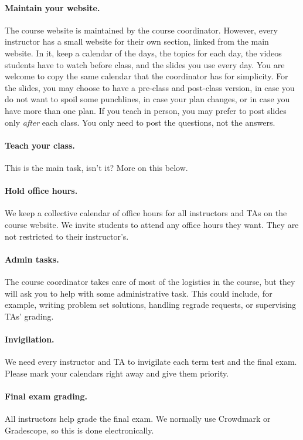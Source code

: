 \documentclass[11pt]{article}
\begin{document}
	\paragraph{Maintain your website.}
	The course website is maintained by the course coordinator. However, every
	instructor has a small website for their own section, linked from the main website.
	In it, keep a calendar of the days, the topics for each day, the videos students
	have to watch before class, and the slides you use every day. You are welcome to
	copy the same calendar that the coordinator has for simplicity. For the slides,
	you may choose to have a pre-class and post-class version, in case you do not
	want to spoil some punchlines, in case your plan changes, or in case you have
	more than one plan. If you teach in person, you may prefer to post slides only
	\emph{after} each class. You only need to post the questions, not the answers.

	\paragraph{Teach your class.}
	This is the main task, isn't it? More on this below.
	\paragraph{Hold office hours.}
	We keep a collective calendar of office hours for all instructors and TAs on
	the course website. We invite students to attend any office hours they want.
	They are not restricted to their instructor's.
	\paragraph{Admin tasks.}
	The course coordinator takes care of most of the logistics in the course, but they
	will ask you to help with some administrative task. This could include, for example,
	writing problem set solutions, handling regrade requests, or supervising TAs' grading.
	\paragraph{Invigilation.}
	We need every instructor and TA to invigilate each term test and the final exam.
	Please mark your calendars right away and give them priority.
	\paragraph{Final exam grading.}
	All instructors help grade the final exam. We normally use Crowdmark or Gradescope,
	so this is done electronically.
\end{document}
